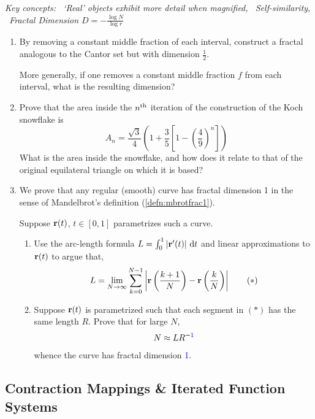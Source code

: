 \pagebreak[3]


\begin{exercises}
	\hangindent\leftmargini\emph{Key concepts: \ `Real' objects exhibit more detail when magnified, \ Self-similarity, \ Fractal Dimension $D=-\frac{\log N}{\log r}$}
	
	\begin{enumerate}
		\item By removing a constant middle fraction of each interval, construct a fractal analogous to the Cantor set but with dimension $\frac 12$.\par
		More generally, if one removes a constant middle fraction $f$ from each interval, what is the resulting dimension?	
		
		
		\item Prove that the area inside the $n\textsuperscript{th}$ iteration of the construction of the Koch snowflake is
		\[
			A_n=\frac{\sqrt 3}{4}\left(1+\frac 35\left[1-\left(\frac 49\right)^n\right]\right)
		\]
		What is the area inside the snowflake, and how does it relate to that of the original equilateral triangle on which it is based?

		
		\item\label{exs:fractaldiffcurve} We prove that any regular (smooth) curve has fractal dimension 1 in the sense of Mandelbrot's definition (\ref{defn:mbrotfrac1}).\par
		Suppose ${\mathbf{r}}(t)$, $t\in [0,1]$ parametrizes such a curve.
		\begin{enumerate}
	  	\item Use the arc-length formula $L=\int_0^1\left| {\mathbf{r}}'(t)\right|\,{\mathrm{d} t}$ and linear approximations to ${\mathbf{r}}(t)$ to argue that,
	  	\[
	  		L=\lim_{N\to\infty}\sum_{k=0}^{N-1}\left| {\mathbf{r}}\left(\frac{k+1}N\right)-{\mathbf{r}}\left(\frac{k}N\right)\right| \tag{$\ast$}
	  	\]
	  	
	  	\item Suppose ${\mathbf{r}}(t)$ is parametrized such that each segment in $(\ast)$ has the same length $R$. Prove that for large $N$,
	  	\[
	  		N\approx LR^{-\mathcolor{Blue}{1}}
	  	\]
	  	whence the curve has fractal dimension \textcolor{Blue}{1}.
	  \end{enumerate}
		
	\end{enumerate}
\end{exercises}


\clearpage


\subsection{Contraction Mappings \& Iterated Function Systems}

